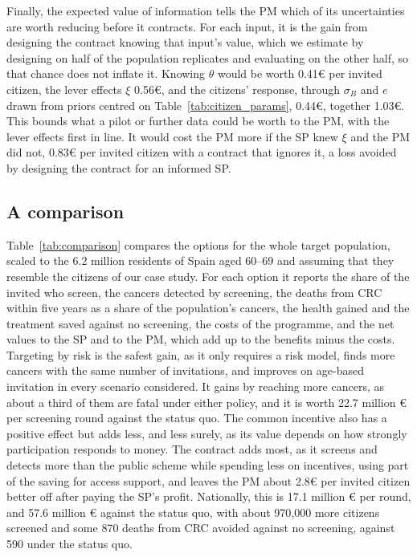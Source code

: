 \documentclass[12pt]{article}
\begin{document}
Finally, the expected value of information \citep{briggs2006decision} tells the PM which of its uncertainties are worth reducing before it contracts. For each input, it is the gain from designing the contract knowing that input's value, which we estimate by designing on half of the population replicates and evaluating on the other half, so that chance does not inflate it. Knowing $\theta$ would be worth 0.41€ per invited citizen, the lever effects $\xi$ 0.56€, and the citizens' response, through $\sigma_B$ and $e$ drawn from priors centred on Table~\ref{tab:citizen_params}, 0.44€, together 1.03€. This bounds what a pilot or further data could be worth to the PM, with the lever effects first in line. It would cost the PM more if the SP knew $\xi$ and the PM did not, 0.83€ per invited citizen with a contract that ignores it, a loss avoided by designing the contract for an informed SP.







\subsection{A comparison} \label{sec:comparison}

Table~\ref{tab:comparison} compares the options for the whole target population, scaled to the 6.2 million residents of Spain aged 60--69 and assuming that they resemble the citizens of our case study. For each option it reports the share of the invited who screen, the cancers detected by screening, the deaths from CRC within five years as a share of the population's cancers, the health gained and the treatment saved against no screening, the costs of the programme, and the net values to the SP and to the PM, which add up to the benefits minus the costs. Targeting by risk is the safest gain, as it only requires a risk model, finds more cancers with the same number of invitations, and improves on age-based invitation in every scenario considered. It gains by reaching more cancers, as about a third of them are fatal under either policy, and it is worth 22.7 million € per screening round against the status quo. The common incentive also has a positive effect but adds less, and less surely, as its value depends on how strongly participation responds to money. The contract adds most, as it screens and detects more than the public scheme while spending less on incentives, using part of the saving for access support, and leaves the PM about 2.8€ per invited citizen better off after paying the SP's profit. Nationally, this is 17.1 million € per round, and 57.6 million € against the status quo, with about 970{,}000 more citizens screened and some 870 deaths from CRC avoided against no screening, against 590 under the status quo.
\end{document}
